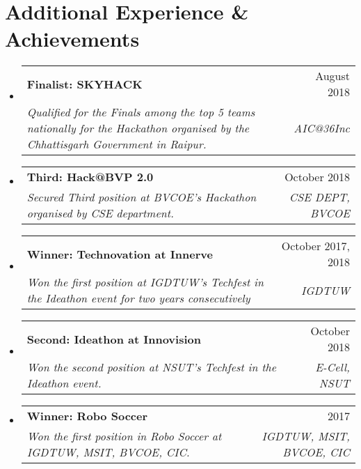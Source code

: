 \documentclass[letterpaper,10pt]{article}
\makeatletter
\newcommand{\resumeSubheading}[4]{
  \vspace{-1pt}\item[]
  \begin{tabular*}{0.98\textwidth}{l@{\extracolsep{\fill}}r}
      \hspace{-10pt}\textbf{#1} & #2 \\
      \hspace{-10pt}\textit{\small#3} & \textit{\small #4} \\
    \end{tabular*}\vspace{-5pt}
}
\newcommand{\resumeSubHeadingListStart}{\begin{itemize}[leftmargin=*]}
\newcommand{\resumeSubHeadingListEnd}{\end{itemize}}
\newcommand{\shorterSection}[1]{\vspace{-10pt}\section{#1}}
\makeatother
\begin{document}
\shorterSection{Additional Experience \& Achievements}
  \resumeSubHeadingListStart
    \resumeSubheading
      {Finalist: SKYHACK}{August 2018}
      {Qualified for the Finals among the top 5 teams nationally for the
Hackathon organised by the Chhattisgarh Government in Raipur.}{AIC@36Inc}
    \resumeSubheading
      {Third: Hack@BVP 2.0}{October 2018}
      {Secured Third position at BVCOE\rq s Hackathon organised by CSE
department.}{CSE DEPT, BVCOE}
    \resumeSubheading
      {Winner: Technovation at Innerve}{October 2017, 2018}
      {Won the first position at IGDTUW\rq s Techfest in the
Ideathon event for two years consecutively}{IGDTUW}
    \resumeSubheading
      {Second: Ideathon at Innovision}{October 2018}
      {Won the second position at NSUT\rq s Techfest in the
Ideathon event.}{E-Cell, NSUT}
    \resumeSubheading
      {Winner: Robo Soccer}{2017}
      {Won the first position in Robo Soccer at IGDTUW, MSIT, BVCOE, CIC.}{IGDTUW, MSIT, BVCOE, CIC}
  \resumeSubHeadingListEnd
\end{document}
